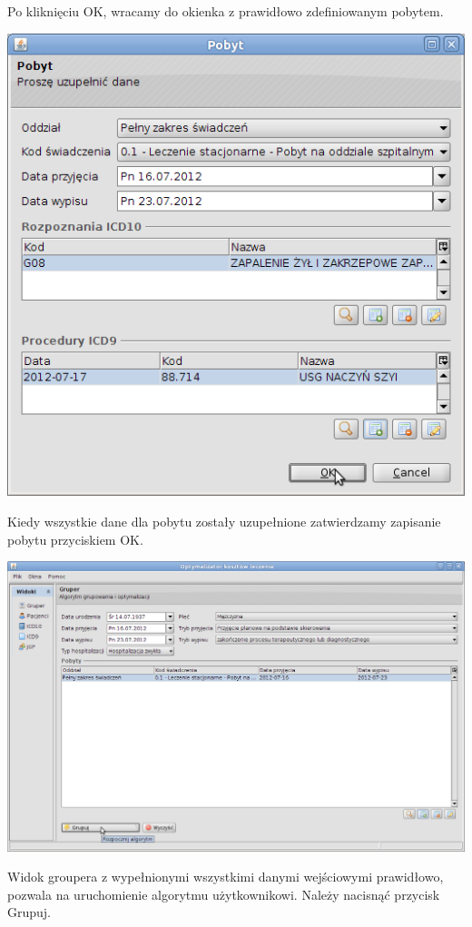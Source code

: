 Po kliknięciu OK, wracamy do okienka z prawidłowo zdefiniowanym pobytem.

\includegraphics[scale=0.4]{images/gruper7}

Kiedy wszystkie dane dla pobytu zostały uzupełnione zatwierdzamy zapisanie pobytu przyciskiem OK.

\includegraphics[scale=0.4]{images/gruper8}

Widok groupera z wypełnionymi wszystkimi danymi wejściowymi prawidłowo, pozwala na uruchomienie algorytmu użytkownikowi. Należy nacisnąć przycisk Grupuj.

